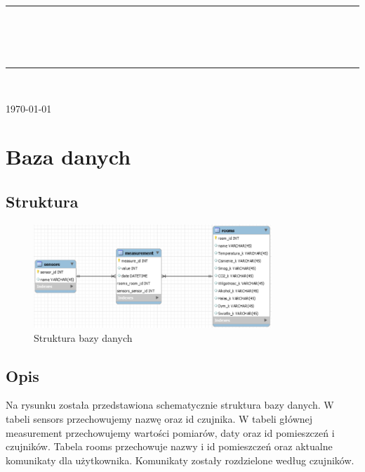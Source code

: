 \documentclass[10pt, a4paper]{article}
\begin{document}
\def\tablename{Tabela}	%

\begin{titlepage}
	\begin{center}
		\textsc{\LARGE \formakursu}\\[1cm]		
		\textsc{\Large \kurs}\\[0.5cm]		
		\rule{\textwidth}{0.08cm}\\[0.4cm]
		{\huge \bfseries \doctype}\\[1cm]
		{\huge \bfseries \projectname}\\[0.5cm]
		\rule{\textwidth}{0.08cm}\\[1cm]
		
		\begin{flushright} \large

		

		
		\end{flushright}
		
		\vfill
		
		{\large \today}
	\end{center}	
\end{titlepage}

\newpage
\tableofcontents
\newpage
\section{Baza danych}
	\subsection{Struktura}
		\begin{figure}[H]
			\centering
			\includegraphics[width=0.8\textwidth]{figures/struktura.png}
			\caption{Struktura bazy danych}
			\label{fig:struktura}
		\end{figure}
	\subsection{Opis}
	Na rysunku \pageref{fig:struktura} została przedstawiona schematycznie struktura bazy danych. W tabeli sensors przechowujemy nazwę oraz id czujnika. W tabeli głównej measurement przechowujemy wartości pomiarów, daty oraz id pomieszczeń i czujników. Tabela rooms przechowuje nazwy i id pomieszczeń oraz aktualne komunikaty dla użytkownika. Komunikaty zostały rozdzielone według czujników.
\end{document}
